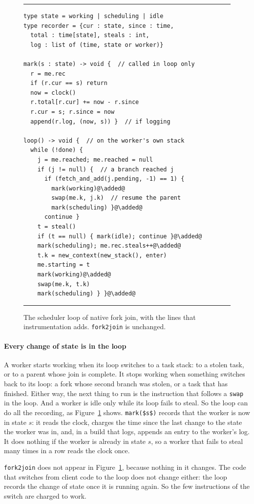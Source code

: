 \documentclass[sigplan,nonacm]{acmart}
\begin{document}
\begin{figure}
\hrule
\begin{lstlisting}[escapechar=@]
type state = working | scheduling | idle
type recorder = {cur : state, since : time,
  total : time[state], steals : int,
  log : list of (time, state or worker)}

mark(s : state) -> void {  // called in loop only
  r = me.rec
  if (r.cur == s) return
  now = clock()
  r.total[r.cur] += now - r.since
  r.cur = s; r.since = now
  append(r.log, (now, s)) }  // if logging

loop() -> void {  // on the worker's own stack
  while (!done) {
    j = me.reached; me.reached = null
    if (j != null) {  // a branch reached j
      if (fetch_and_add(j.pending, -1) == 1) {
        mark(working)@\added@
        swap(me.k, j.k)  // resume the parent
        mark(scheduling) }@\added@
      continue }
    t = steal()
    if (t == null) { mark(idle); continue }@\added@
    mark(scheduling); me.rec.steals++@\added@
    t.k = new_context(new_stack(), enter)
    me.starting = t
    mark(working)@\added@
    swap(me.k, t.k)
    mark(scheduling) } }@\added@
\end{lstlisting}
\hrule
\caption{The scheduler loop of native fork join, with the lines that
  instrumentation adds.
  \lstinline|fork2join| is unchanged.}
\label{fig:loop}
\end{figure}

\paragraph{Every change of state is in the loop}
%
A worker starts working when its loop switches to a task stack: to a
stolen task, or to a parent whose join is complete.
%
It stops working when something switches back to its loop: a fork
whose second branch was stolen, or a task that has finished.
%
Either way, the next thing to run is the instruction that follows a
\lstinline|swap| in the loop.
%
And a worker is idle only while its loop fails to steal.
%
So the loop can do all the recording, as Figure~\ref{fig:loop} shows.
%
\lstinline|mark($s$)| records that the worker is now in state $s$: it
reads the clock, charges the time since the last change to the state
the worker was in, and, in a build that logs, appends an entry to the
worker's log.
%
It does nothing if the worker is already in state $s$, so a worker
that fails to steal many times in a row reads the clock once.

\lstinline|fork2join| does not appear in Figure~\ref{fig:loop},
because nothing in it changes.
%
The code that switches from client code to the loop does not change
either: the loop records the change of state once it is running again.
%
So the few instructions of the switch are charged to work.
\end{document}
